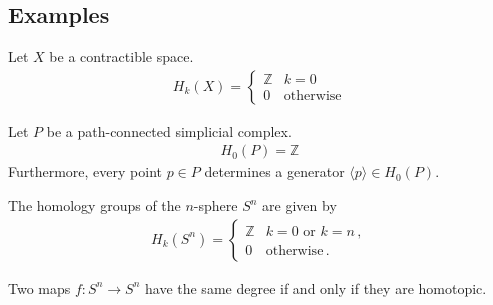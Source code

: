 \subsection{Examples}

    \begin{example}\label{topology:point_homology}
        Let $X$ be a contractible space.
        \begin{gather}
            H_k(X) =
            \begin{cases}
                \mathbb{Z}&k=0\\
                0&\text{otherwise}
            \end{cases}
        \end{gather}
    \end{example}
    \begin{example}
        Let $P$ be a path-connected simplicial complex.
        \begin{gather}
            H_0(P) = \mathbb{Z}
        \end{gather}
        Furthermore, every point $p\in P$ determines a generator $\langle p \rangle\in H_0(P)$.
    \end{example}

    \begin{example}
        The homology groups of the $n$-sphere $S^n$ are given by
        \begin{gather}
            H_k(S^n)=
            \begin{cases}
                \mathbb{Z}&k=0\text{ or }k=n\,,\\
                0&\text{otherwise}\,.
            \end{cases}
        \end{gather}
    \end{example}

    \begin{property}
        Two maps $f:S^n\rightarrow S^n$ have the same degree if and only if they are homotopic.
    \end{property}

